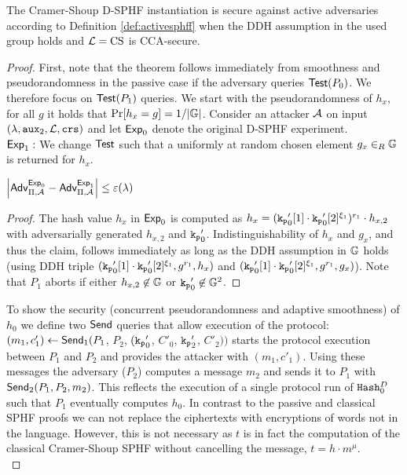 \begin{theorem}\label{theo:cssphff}
The Cramer-Shoup \ac{D-SPHF} instantiation is secure against active adversaries according to Definition \ref{def:activesphff} when the \ac{DDH} assumption in the used group \GG holds and $\mathcal{L}=\mathrm{CS}$ is \ac{CCA}-secure.
\end{theorem}
\begin{proof}
First, note that the theorem follows immediately from smoothness and pseudorandomness in the passive case if the adversary queries $\mathsf{Test}(P_0)$.
We therefore focus on $\mathsf{Test}(P_1)$ queries.
We start with the pseudorandomness of $h_x$, \ie for all $g$ it holds that $\Pr[h_x=g]=1/|\mathbb{G}|$.
Consider an attacker $\mathcal{A}$ on input $(\lambda,\mathtt{aux}_2,\mathcal{L},\mathtt{crs})$ and let $\mathsf{Exp}_0$ denote the original \ac{D-SPHF} experiment.\\

\noindent$\mathsf{Exp}_1:$
We change $\mathsf{Test}$ such that a uniformly at random chosen element $g_x\in_R\mathbb{G}$ is returned for $h_x$.

\begin{claim}
$\left|\mathsf{Adv}_{\Pi,\mathcal{A}}^{\mathsf{Exp}_0}-\mathsf{Adv}_{\Pi,\mathcal{A}}^{\mathsf{Exp}_1}\right|\leq\varepsilon(\lambda)$
\end{claim}

\begin{proof}
The hash value $h_x$ in $\mathsf{Exp}_0$ is computed as $h_x=(\mathtt{k_p}'_0[1]\cdot\mathtt{k_p}'_0[2]^{\xi_1})^{r_1}\cdot h_{x,2}$ with adversarially generated $h_{x,2}$ and $\mathtt{k_p}'_0$.
Indistinguishability of $h_x$ and $g_x$, and thus the claim, follows immediately as long as the \ac{DDH} assumption in $\mathbb{G}$ holds (using \ac{DDH} triple $(\mathtt{k_p}'_0[1]\cdot\mathtt{k_p}'_0[2]^{\xi_1},g^{r_1},h_x)$ and $(\mathtt{k_p}'_0[1]\cdot\mathtt{k_p}'_0[2]^{\xi_1},g^{r_1},g_x)$).
Note that $P_1$ aborts if either $h_{x,2}\not\in\mathbb{G}$ or $\mathtt{k_p}_0'\not\in\mathbb{G}^2$.
\end{proof}

\noindent
To show the security (concurrent pseudorandomness and adaptive smoothness) of $h_0$ we define two $\mathsf{Send}$ queries that allow execution of the protocol:
$(m_1,c'_1)\gets\mathsf{Send}_1(P_1$, $P_2$, $(\mathtt{k_p}'_0$, $C'_0$, $\mathtt{k_p}'_2$, $C'_2))$ starts the protocol execution between $P_1$ and $P_2$ and provides the attacker with $(m_1,c'_1)$.
Using these messages the adversary ($P_2$) computes a message $m_2$ and sends it to $P_1$ with $\mathsf{Send}_2(P_1,P_2,m_2)$.
This reflects the execution of a single protocol run of $\mathtt{Hash}_0^D$ such that $P_1$ eventually computes $h_0$.
In contrast to the passive and classical SPHF proofs we can not replace the ciphertexts with encryptions of words not in the language.
However, this is not necessary as $t$ is in fact the \Hash computation of the classical Cramer-Shoup SPHF without cancelling the message, \ie $t=h\cdot m^\mu$.\\


\end{proof}
